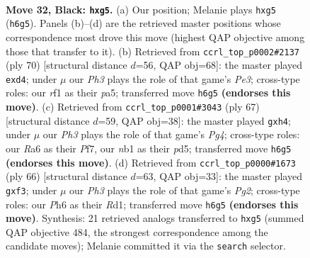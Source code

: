 \documentclass[11pt]{article}
\begin{document}
\clearpage

\begin{figure}[p]\centering
\begin{subfigure}{0.46\textwidth}\centering
\resizebox{\linewidth}{!}{%
\newchessgame
\chessboard[
  setfen={1r4k1/2pq1p2/r6p/2p1p1BQ/2P1P1P1/3P4/7K/1N3R2 b - - 0 32},
  showmover=false,
  pgfstyle=straightmove, color=movearrow, markmove={h6-g5}
]}
\caption{}
\end{subfigure}\hfill
\begin{subfigure}{0.46\textwidth}\centering
\resizebox{\linewidth}{!}{%
\newchessgame
\chessboard[
  setfen={2r3k1/5pp1/4p2p/p6Q/P1Pb4/3qP2P/5PP1/4R1K1 w - - 0 36},
  showmover=false,
  pgfstyle=straightmove, color=movearrow, markmove={e3-d4}
]}
\caption{}
\end{subfigure}
\\[4pt]
\begin{subfigure}{0.46\textwidth}\centering
\resizebox{\linewidth}{!}{%
\newchessgame
\chessboard[
  setfen={3r2k1/p3pp1p/5q1P/1p1P2p1/6PB/4Q3/5P2/4R1K1 b - - 0 34},
  showmover=false,
  pgfstyle=straightmove, color=movearrow, markmove={g5-h4}
]}
\caption{}
\end{subfigure}\hfill
\begin{subfigure}{0.46\textwidth}\centering
\resizebox{\linewidth}{!}{%
\newchessgame
\chessboard[
  setfen={4r2k/2p2qp1/7p/1Q5P/3P4/5bP1/1P4P1/3R2K1 w - - 0 34},
  showmover=false,
  pgfstyle=straightmove, color=movearrow, markmove={g2-f3}
]}
\caption{}
\end{subfigure}
\caption{\textbf{Move 32, Black: \texttt{hxg5}.} (a) Our position; Melanie plays \texttt{hxg5} (\texttt{h6g5}). Panels (b)--(d) are the retrieved master positions whose correspondence most drove this move (highest QAP objective among those that transfer to it). (b) Retrieved from \texttt{ccrl\_top\_p0002\#2137} (ply 70) [structural distance $d$=56, QAP obj=68]: the master played \texttt{exd4}; under $\mu$ our \emph{Ph3} plays the role of that game's \emph{Pe3}; cross-type roles: our \emph{r}f1 as their \emph{p}a5; transferred move \texttt{h6g5} \textbf{(endorses this move)}. (c) Retrieved from \texttt{ccrl\_top\_p0001\#3043} (ply 67) [structural distance $d$=59, QAP obj=38]: the master played \texttt{gxh4}; under $\mu$ our \emph{Ph3} plays the role of that game's \emph{Pg4}; cross-type roles: our \emph{R}a6 as their \emph{P}f7, our \emph{n}b1 as their \emph{p}d5; transferred move \texttt{h6g5} \textbf{(endorses this move)}. (d) Retrieved from \texttt{ccrl\_top\_p0000\#1673} (ply 66) [structural distance $d$=63, QAP obj=33]: the master played \texttt{gxf3}; under $\mu$ our \emph{Ph3} plays the role of that game's \emph{Pg2}; cross-type roles: our \emph{P}h6 as their \emph{R}d1; transferred move \texttt{h6g5} \textbf{(endorses this move)}. Synthesis: 21 retrieved analogs transferred to \texttt{hxg5} (summed QAP objective 484, the strongest correspondence among the candidate moves); Melanie committed it via the \texttt{search} selector.}
\label{fig:thought-m63}
\end{figure}
\end{document}
